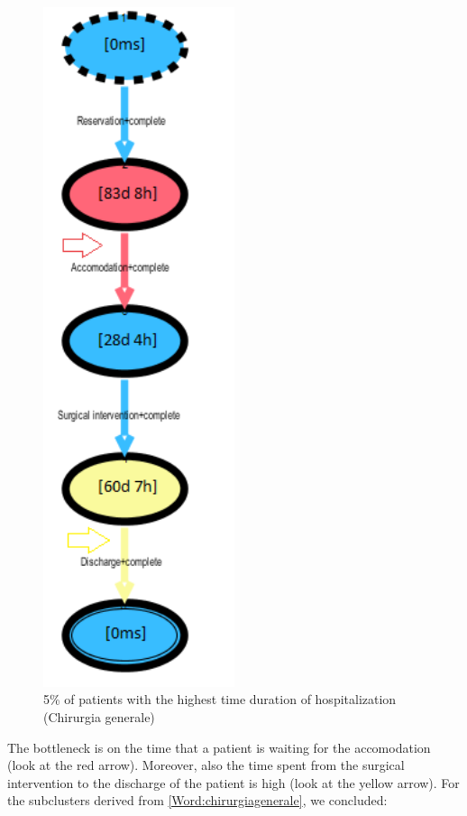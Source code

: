 \begin{figure} [htbp]
\begin{minipage}[t]{0.32\textwidth}
\includegraphics[width=0.5\textwidth]{RicoveriTransitionSystemSojourn0901Slow}
\caption{5\% of patients with the highest time duration of hospitalization (Chirurgia generale)}
\end{minipage}
\end{figure}
\clearpage
\noindent
The bottleneck is on the time that a patient is waiting for the accomodation (look at the red arrow). Moreover, also the time spent from the surgical intervention to the discharge of the patient is high (look at the yellow arrow). For the subclusters derived from \ref{Word:chirurgiagenerale}, we concluded:
